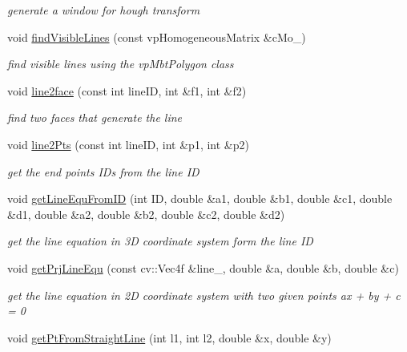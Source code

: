 \begin{DoxyCompactItemize}
\begin{DoxyCompactList}\small\item\em generate a window for hough transform \end{DoxyCompactList}\item 
void \hyperlink{classhoughLineBasedTracker_a7ead438c8cf14248b24e538c33a76a0a}{find\-Visible\-Lines} (const vp\-Homogeneous\-Matrix \&c\-Mo\-\_\-)
\begin{DoxyCompactList}\small\item\em find visible lines using the vp\-Mbt\-Polygon class \end{DoxyCompactList}\item 
void \hyperlink{classhoughLineBasedTracker_acf7ed7709862ddf301a445a1791d83ab}{line2face} (const int line\-I\-D, int \&f1, int \&f2)
\begin{DoxyCompactList}\small\item\em find two faces that generate the line \end{DoxyCompactList}\item 
void \hyperlink{classhoughLineBasedTracker_a387be1e232a912c018c18eec30f6531d}{line2\-Pts} (const int line\-I\-D, int \&p1, int \&p2)
\begin{DoxyCompactList}\small\item\em get the end points \-I\-Ds from the line \-I\-D \end{DoxyCompactList}\item 
void \hyperlink{classhoughLineBasedTracker_a63375bf97cd00db97b8b9a638adda72b}{get\-Line\-Equ\-From\-I\-D} (int \-I\-D, double \&a1, double \&b1, double \&c1, double \&d1, double \&a2, double \&b2, double \&c2, double \&d2)
\begin{DoxyCompactList}\small\item\em get the line equation in 3\-D coordinate system form the line \-I\-D \end{DoxyCompactList}\item 
void \hyperlink{classhoughLineBasedTracker_a0fc0f63e61bbb1de64adee807e7fc2e6}{get\-Prj\-Line\-Equ} (const cv\-::\-Vec4f \&line\-\_\-, double \&a, double \&b, double \&c)
\begin{DoxyCompactList}\small\item\em get the line equation in 2\-D coordinate system with two given points ax + by + c = 0 \end{DoxyCompactList}\item 
void \hyperlink{classhoughLineBasedTracker_a04878ce14fe321139d76c61dbece76ba}{get\-Pt\-From\-Straight\-Line} (int l1, int l2, double \&x, double \&y)

\end{DoxyCompactItemize}
